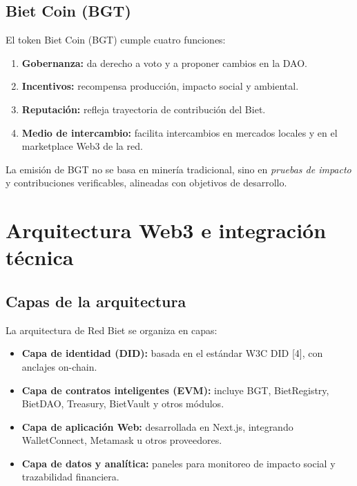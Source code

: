 \documentclass[12pt]{report}
\begin{document}
\section{Biet Coin (BGT)}
El token Biet Coin (BGT) cumple cuatro funciones:
\begin{enumerate}
    \item \textbf{Gobernanza:} da derecho a voto y a proponer cambios en la DAO.
    \item \textbf{Incentivos:} recompensa producción, impacto social y ambiental.
    \item \textbf{Reputación:} refleja trayectoria de contribución del Biet.
    \item \textbf{Medio de intercambio:} facilita intercambios en mercados locales y en el marketplace Web3 de la red.
\end{enumerate}

La emisión de BGT no se basa en minería tradicional, sino en \textit{pruebas de impacto} y contribuciones verificables, alineadas con objetivos de desarrollo.

\chapter{Arquitectura Web3 e integración técnica}

\section{Capas de la arquitectura}
La arquitectura de Red Biet se organiza en capas:

\begin{itemize}
    \item \textbf{Capa de identidad (DID):} basada en el estándar W3C DID [4], con anclajes on-chain.
    \item \textbf{Capa de contratos inteligentes (EVM):} incluye BGT, BietRegistry, BietDAO, Treasury, BietVault y otros módulos.
    \item \textbf{Capa de aplicación Web:} desarrollada en Next.js, integrando WalletConnect, Metamask u otros proveedores.
    \item \textbf{Capa de datos y analítica:} paneles para monitoreo de impacto social y trazabilidad financiera.
\end{itemize}
\end{document}
